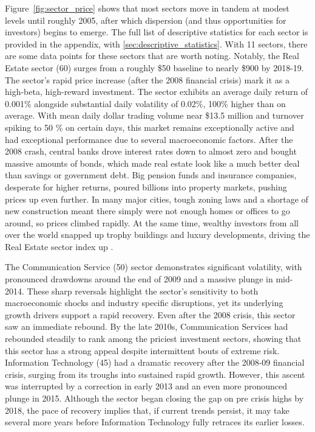 Figure~\ref{fig:sector_price} shows that most sectors move in tandem at modest levels until roughly 2005, after which dispersion (and thus opportunities for investors) begins to emerge. The full list of descriptive statistics for each sector is provided in the appendix, with \cref{sec:descriptive_statistics}. With 11 sectors, there are some data points for these sectors that are worth noting. Notably, the Real Estate sector (60) surges from a roughly \$50 baseline to nearly \$900 by 2018-19. The sector's rapid price increase (after the 2008 financial crisis) mark it as a high-beta, high-reward investment. The sector exhibits an average daily return of 0.001\% alongside substantial daily volatility of 0.02\%, 100\% higher than on average. With mean daily dollar trading volume near \$13.5 million and turnover spiking to 50 \% on certain days, this market remains exceptionally active and had exceptional performance due to several macroeconomic factors. After the 2008 crash, central banks drove interest rates down to almost zero and bought massive amounts of bonds, which made real estate look like a much better deal than savings or government debt. Big pension funds and insurance companies, desperate for higher returns, poured billions into property markets, pushing prices up even further. In many major cities, tough zoning laws and a shortage of new construction meant there simply were not enough homes or offices to go around, so prices climbed rapidly. At the same time, wealthy investors from all over the world snapped up trophy buildings and luxury developments, driving the Real Estate sector index up \cite{cbre_2018}. %

The Communication Service (50) sector demonstrates significant volatility, with pronounced drawdowns around the end of 2009 and a massive plunge in mid-2014. These sharp reversals highlight the sector's sensitivity to both macroeconomic shocks and industry specific disruptions, yet its underlying growth drivers support a rapid recovery. Even after the 2008 crisis, this sector saw an immediate rebound. By the late 2010s, Communication Services had rebounded steadily to rank among the priciest investment sectors, showing that this sector has a strong appeal despite intermittent bouts of extreme risk. Information Technology (45) had a dramatic recovery after the 2008-09 financial crisis, surging from its troughs into sustained rapid growth. However, this ascent was interrupted by a correction in early 2013 and an even more pronounced plunge in 2015. Although the sector began closing the gap on pre crisis highs by 2018, the pace of recovery implies that, if current trends persist, it may take several more years before Information Technology fully retraces its earlier losses.

